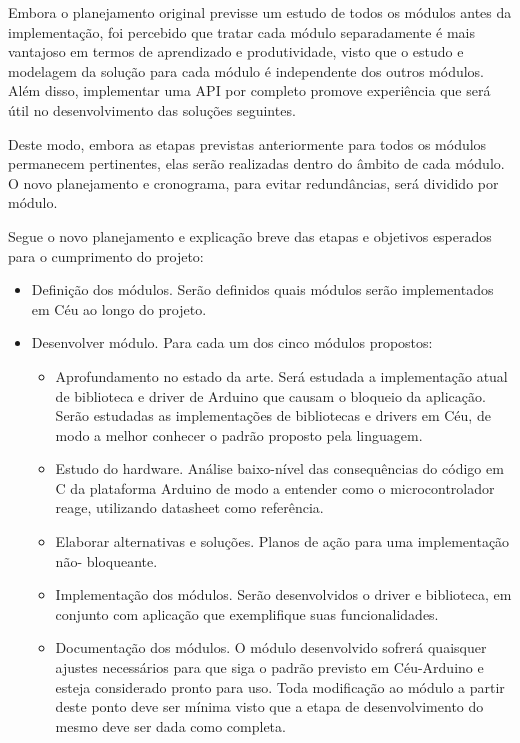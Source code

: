 \documentclass{article}
\begin{document}
\tab Embora o planejamento original previsse um estudo de todos os módulos antes da implementação,
foi percebido que tratar cada módulo separadamente é mais vantajoso em termos de aprendizado e
produtividade, visto que o estudo e modelagem da solução para cada módulo é independente dos
outros módulos. Além disso, implementar uma API por completo promove experiência que será útil
no desenvolvimento das soluções seguintes.
\par Deste modo, embora as etapas previstas anteriormente para todos os módulos permanecem
pertinentes, elas serão realizadas dentro do âmbito de cada módulo. O novo planejamento e
cronograma, para evitar redundâncias, será dividido por módulo.
\par Segue o novo planejamento e explicação breve das etapas e objetivos esperados para o cumprimento
do projeto:
\begin{itemize}

\item Definição dos módulos. Serão definidos quais módulos serão implementados em Céu ao
longo do projeto.
\item Desenvolver módulo. Para cada um dos cinco módulos propostos:
\begin{itemize}

\item Aprofundamento no estado da arte. Será estudada a implementação atual de
biblioteca e driver de Arduino que causam o bloqueio da aplicação. Serão estudadas
as implementações de bibliotecas e drivers em Céu, de modo a melhor conhecer o
padrão proposto pela linguagem.
\item Estudo do hardware. Análise baixo-nível das consequências do código em C da
plataforma Arduino de modo a entender como o microcontrolador reage, utilizando
datasheet como referência.
\item Elaborar alternativas e soluções. Planos de ação para uma implementação não-
bloqueante.
\item Implementação dos módulos. Serão desenvolvidos o driver e biblioteca, em conjunto
com aplicação que exemplifique suas funcionalidades.
\item Documentação dos módulos. O módulo desenvolvido sofrerá quaisquer ajustes
necessários para que siga o padrão previsto em Céu-Arduino e esteja considerado
pronto para uso. Toda modificação ao módulo a partir deste ponto deve ser mínima
visto que a etapa de desenvolvimento do mesmo deve ser dada como completa.

\end{itemize}


\end{itemize}
\end{document}

